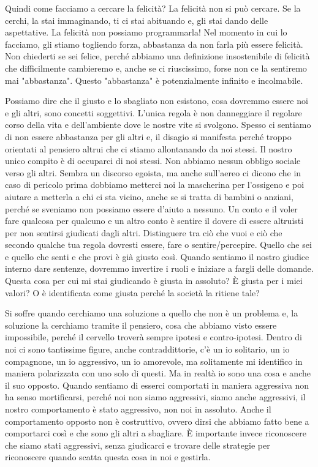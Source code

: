 \documentclass[12pt]{book} %
\begin{document}
Quindi come facciamo a cercare la felicità? 
La felicità non si può cercare. Se la cerchi, la stai immaginando, ti ci stai abituando e, gli stai dando delle
aspettative. La felicità non possiamo programmarla! Nel momento in cui lo facciamo, gli stiamo togliendo forza, abbastanza da non farla più essere felicità. Non chiederti se sei felice, perché abbiamo una definizione insostenibile di felicità che difficilmente cambieremo e, anche se ci riuscissimo, forse non ce la sentiremo mai "abbastanza". Questo "abbastanza" è potenzialmente infinito e incolmabile. 

Possiamo dire che il giusto e lo sbagliato non esistono, cosa dovremmo essere noi e gli altri, sono concetti
soggettivi. L'unica regola è non danneggiare il regolare corso della vita e
dell'ambiente dove le nostre vite si svolgono. Spesso ci sentiamo di non essere abbastanza per gli
altri e, il disagio si manifesta perché troppo orientati al pensiero altrui che ci stiamo allontanando da noi stessi.
Il nostro unico compito è di occuparci di noi stessi. Non abbiamo nessun obbligo sociale verso gli altri. Sembra un
discorso egoista, ma anche sull'aereo ci dicono che in caso di pericolo prima dobbiamo
metterci noi la mascherina per l'ossigeno e poi aiutare a metterla a chi ci sta vicino, anche se
si tratta di bambini o anziani, perché se sveniamo non possiamo essere d'aiuto a nessuno. 
Un conto e il voler fare qualcosa per qualcuno e un altro conto è sentire il
dovere di essere altruisti per non sentirsi giudicati dagli altri. Distinguere tra ciò
che vuoi e ciò che secondo qualche tua regola dovresti essere, fare o sentire/percepire. Quello che sei e quello che
senti e che provi è già giusto così. 
Quando sentiamo il nostro giudice interno dare sentenze, dovremmo invertire i ruoli e iniziare a fargli delle domande. Questa
cosa per cui mi stai giudicando è giusta in assoluto? È giusta per i miei valori? O è identificata come giusta perché
la società la ritiene tale?

Si soffre quando cerchiamo una soluzione a quello che non è un problema e, la soluzione la cerchiamo tramite il
pensiero, cosa che abbiamo visto essere impossibile, perché il cervello troverà sempre ipotesi e contro-ipotesi. Dentro
di noi ci sono tantissime figure, anche contraddittorie, c'è un io solitario, un io compagnone, un io aggressivo, un io
amorevole, ma solitamente mi identifico in maniera polarizzata con uno solo di questi. Ma in realtà io sono una cosa e
anche il suo opposto. Quando sentiamo di esserci comportati in maniera aggressiva non ha senso mortificarsi, perché noi
non siamo aggressivi, siamo anche aggressivi, il nostro comportamento è stato aggressivo, non noi in assoluto. Anche il
comportamento opposto non è costruttivo, ovvero dirsi che abbiamo fatto bene a comportarci così e che sono gli altri a
sbagliare. È importante invece riconoscere che siamo stati aggressivi, senza giudicarci e trovare delle strategie per
riconoscere quando scatta questa cosa in noi e gestirla. 
\end{document}
